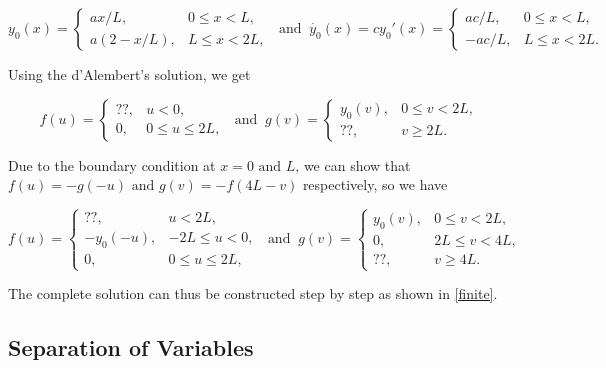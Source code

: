 \documentclass[a4paper,12pt]{report}
\begin{document}
\begin{equation}
	y_0 (x) = \begin{cases}
		ax /L,& 0 \le x < L,\\
		a(2-x /L),& L \le x <2L,
	\end{cases} ~\text { and }~ \dot{y_0 }(x) = cy_0'(x) = \begin{cases}
		ac /L,& 0 \le x<L,\\
		-ac /L,& L \le x <2L.
	\end{cases} 
\end{equation}

Using the d'Alembert's solution, we get 

\begin{equation}
	f(u) = \begin{cases}
		??,& u < 0,\\
		0,& 0 \le u \le 2L,
	\end{cases} ~\text { and }~ g(v) = \begin{cases}
		y_0 (v),& 0 \le  v < 2L,\\
		?? ,& v \ge 2L.
	\end{cases}
\end{equation}

Due to the boundary condition at \(x=0 \text { and } L\), we can show that \(f(u) = -g(-u) \text { and } g(v) = -f(4L-v)\) respectively, so we have

\begin{equation}
	f(u) = \begin{cases}
		??,& u < 2L,\\
		-y_0 (-u),& -2L \le u <0,\\
		0,& 0 \le u \le 2L,
	\end{cases} ~\text { and }~ g(v) = \begin{cases}
		y_0 (v),& 0 \le  v < 2L,\\
		0,& 2L \le v <4L,\\ 
		?? ,& v \ge 4L.
	\end{cases}
\end{equation}

The complete solution can thus be constructed step by step as shown in \cref{finite}.






\subsection{Separation of Variables} \label{sepvar} 
\end{document}
